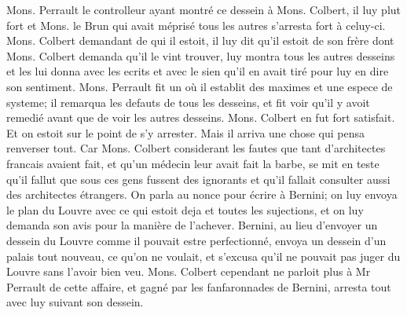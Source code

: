 Mons. Perrault\protect{} le controlleur ayant montr\'{e} ce dessein à Mons. Colbert,\protect{}
il luy plut fort et Mons. le Brun\protect{} qui avait m\'{e}pris\'{e} tous les autres s'arresta fort à celuy-ci.
Mons. Colbert\protect{} demandant de qui il estoit,
il luy dit qu'il estoit de son fr\`{e}re dont Mons. Colbert\protect{} demanda qu'il le vint trouver, luy montra tous les autres desseins et les lui donna avec les ecrits et avec le sien qu'il en avait tir\'{e} pour luy en dire son sentiment.
Mons. Perrault\protect{} fit un
o\`{u} il establit des maximes et une espece de systeme; il remarqua les defauts de tous les desseins, et fit voir qu'il y avoit remedi\'{e} avant que de voir les autres desseins. Mons. Colbert\protect{} en fut fort satisfait. Et on estoit sur le point de s'y arrester. Mais il arriva une chose qui pensa renverser tout. Car Mons.  Colbert\protect{} considerant les fautes que tant d'architectes francais avaient fait, et qu'un m\'{e}decin leur avait fait la barbe, se mit en teste qu'il fallut que sous ces gens fussent des ignorants et qu'il fallait consulter aussi des architectes \'{e}trangers. On parla au nonce pour \'{e}crire \`{a} Bernini\protect{}; on luy envoya le plan du Louvre\protect{} avec ce qui estoit deja et toutes les sujections, et on luy demanda son avis pour la mani\`{e}re de l'achever. Bernini\protect{}, au lieu d'envoyer un dessein du Louvre\protect{} comme il pouvait estre perfectionn\'{e}, envoya un dessein d'un palais tout nouveau, ce qu'on ne voulait, et s'excusa qu'il ne pouvait pas juger du Louvre\protect{} sans l'avoir bien veu.  Mons. Colbert\protect{} cependant ne parloit plus à Mr Perrault\protect{} de cette affaire, et gagn\'{e} par les fanfaronnades de Bernini\protect{}, arresta tout avec luy suivant son dessein.%
